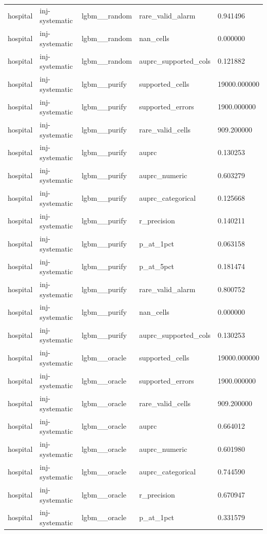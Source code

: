 \begin{tabular}{lllll}
hospital & inj-systematic & lgbm\_\_random & rare\_valid\_alarm & 0.941496 \\
hospital & inj-systematic & lgbm\_\_random & nan\_cells & 0.000000 \\
hospital & inj-systematic & lgbm\_\_random & auprc\_supported\_cols & 0.121882 \\
hospital & inj-systematic & lgbm\_\_purify & supported\_cells & 19000.000000 \\
hospital & inj-systematic & lgbm\_\_purify & supported\_errors & 1900.000000 \\
hospital & inj-systematic & lgbm\_\_purify & rare\_valid\_cells & 909.200000 \\
hospital & inj-systematic & lgbm\_\_purify & auprc & 0.130253 \\
hospital & inj-systematic & lgbm\_\_purify & auprc\_numeric & 0.603279 \\
hospital & inj-systematic & lgbm\_\_purify & auprc\_categorical & 0.125668 \\
hospital & inj-systematic & lgbm\_\_purify & r\_precision & 0.140211 \\
hospital & inj-systematic & lgbm\_\_purify & p\_at\_1pct & 0.063158 \\
hospital & inj-systematic & lgbm\_\_purify & p\_at\_5pct & 0.181474 \\
hospital & inj-systematic & lgbm\_\_purify & rare\_valid\_alarm & 0.800752 \\
hospital & inj-systematic & lgbm\_\_purify & nan\_cells & 0.000000 \\
hospital & inj-systematic & lgbm\_\_purify & auprc\_supported\_cols & 0.130253 \\
hospital & inj-systematic & lgbm\_\_oracle & supported\_cells & 19000.000000 \\
hospital & inj-systematic & lgbm\_\_oracle & supported\_errors & 1900.000000 \\
hospital & inj-systematic & lgbm\_\_oracle & rare\_valid\_cells & 909.200000 \\
hospital & inj-systematic & lgbm\_\_oracle & auprc & 0.664012 \\
hospital & inj-systematic & lgbm\_\_oracle & auprc\_numeric & 0.601980 \\
hospital & inj-systematic & lgbm\_\_oracle & auprc\_categorical & 0.744590 \\
hospital & inj-systematic & lgbm\_\_oracle & r\_precision & 0.670947 \\
hospital & inj-systematic & lgbm\_\_oracle & p\_at\_1pct & 0.331579 \\

\end{tabular}
